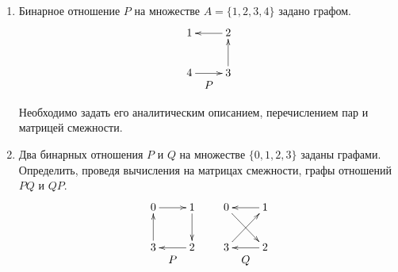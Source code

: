 \begin{enumerate}
    
    \item Бинарное отношение $P$ на множестве $A=\{1,2,3,4\}$ задано графом.
    \[
        \begin{array}{c}
            {
                \xymatrix{
                    1
                        &2 \ar@{->}[l]
                            \\
                    4 \ar@{->}[r]
                        &3 \ar@{->}[u]
                }    
            }\\
            P
        \end{array}
    \]
    
    Необходимо задать его аналитическим описанием, перечислением пар и матрицей смежности.
    
    
    \item Два бинарных отношения $P$ и $Q$ на множестве $\{0,1,2,3\}$ заданы графами. Определить, проведя вычисления на матрицах смежности, графы отношений $PQ$ и $QP$.
    \[
        \begin{array}{cc}
            \begin{array}{c}
                {
                    \xymatrix{
                        0  \ar@{->}[r]
                            &1 \ar@{->}[d]
                                \\
                        3 \ar@{->}[u]
                            &2 \ar@{->}[l]
                    }    
                }\\
                P
            \end{array}
            &
            \begin{array}{c}
                {
                    \xymatrix{
                        0  \ar@{->}[dr]
                            &1 \ar@{->}[l]
                                \\
                        3 \ar@{->}[ur]
                            &2 \ar@{->}[l]
                    }    
                }\\
                Q
            \end{array}
        \end{array}
    \]


\end{enumerate}
